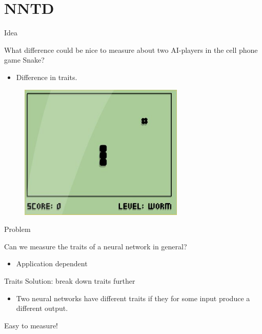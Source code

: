 \section{NNTD}
\begin{frame}{Idea}
\begin{center}
  What difference could be nice to measure about two AI-players in the cell phone game Snake?
  \begin{itemize}
  \item Difference in traits.
  \end{itemize}
  \begin{figure}[p]
  \includegraphics[width=0.7\textwidth]{images/snake.jpg}
  \end{figure}
  \end{center}
\end{frame}

\begin{frame}{Problem}
\begin{center}
	Can we measure the traits of a neural network in general?
	\begin{itemize}
	\item Application dependent
	\end{itemize}
\end{center}
\end{frame}

\begin{frame}{Traits}
  Solution: break down traits further
  \begin{itemize}
	\item Two neural networks have different traits if they for some input produce a different output.
  \end{itemize}
      \vspace{30pt}
  Easy to measure!
\end{frame}

